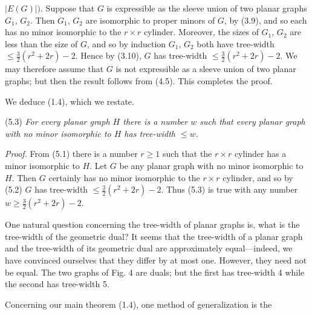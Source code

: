 \noindent $|E(G)|)$. Suppose that $G$ is expressible as the sleeve union of two planar graphs $G_1$, $G_2$. Then $G_1$, $G_2$ are isomorphic to proper minors of $G$, by (3.9), and so each has no minor isomorphic to the $r \times r$ cylinder. Moreover, the sizes of $G_1$, $G_2$ are less than the size of $G$, and so by induction $G_1$, $G_2$ both have tree-width $\le \frac{3}{2}(r^2 + 2r) - 2$. Hence by (3.10), $G$ has tree-width $\le \frac{3}{2}(r^2 + 2r) - 2$. We may therefore assume that $G$ is not expressible as a sleeve union of two planar graphs; but then the result follows from (4.5). This completes the proof.

We deduce (1.4), which we restate.

\stmt
(5.3) \textit{For every planar graph $H$ there is a number $w$ such that every planar graph with no minor isomorphic to $H$ has tree-width $\le w$.}

\textit{Proof.} From (5.1) there is a number $r \ge 1$ such that the $r \times r$ cylinder has a minor isomorphic to $H$. Let $G$ be any planar graph with no minor isomorphic to $H$. Then $G$ certainly has no minor isomorphic to the $r \times r$ cylinder, and so by (5.2) $G$ has tree-width $\le \frac{3}{2}(r^2 + 2r) - 2$. Thus (5.3) is true with any number $w \ge \frac{3}{2}(r^2 + 2r) - 2$.


One natural question concerning the tree-width of planar graphs is, what is the tree-width of the geometric dual? It seems that the tree-width of a planar graph and the tree-width of its geometric dual are approximately equal---indeed, we have convinced ourselves that they differ by at most one. However, they need not be equal. The two graphs of Fig. 4 are duals; but the first has tree-width 4 while the second has tree-width 5.

Concerning our main theorem (1.4), one method of generalization is the

